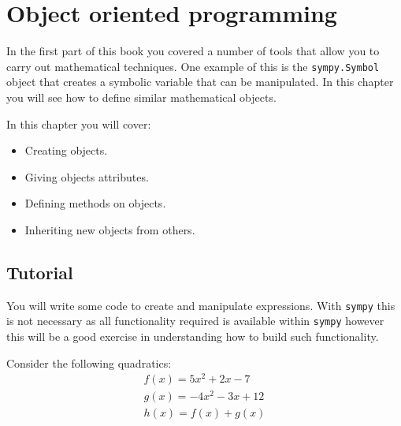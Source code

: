 \chapter{Object oriented programming}
\label{chp:objects}

In the first part of this book you covered a number of tools that allow you to
carry out mathematical techniques. One example of this is the \texttt{sympy.Symbol}
object that creates a symbolic variable that can be manipulated. In this chapter
you will see how to define similar mathematical objects.


\begin{note}
In this chapter you will cover:
\begin{itemize}
\item 

Creating objects.

\item 

Giving objects attributes.

\item 

Defining methods on objects.

\item 

Inheriting new objects from others.

\end{itemize}
\end{note}





\section{Tutorial}
\label{sec:objects_tutorial}

You will write some code to create and manipulate  expressions.
With \texttt{sympy} this is not necessary as all functionality required is available
within \texttt{sympy} however this will be a good exercise in understanding how to
build such functionality.


Consider the following quadratics:
\begin{equation*}
\begin{split}
f(x) = 5 x ^ 2 + 2 x - 7\\
g(x) = - 4 x ^ 2 - 3 x + 12\\
h(x) = f(x) + g(x)
\end{split}
\end{equation*}

